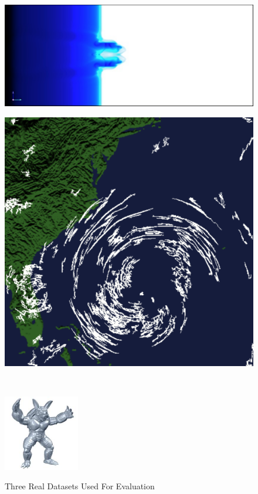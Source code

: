 \begin{figure}[h]
		\begin{center}
			\begin{subfloat}{%
				\includegraphics[scale=0.5]{figures/ionisation_front_instabilities.pdf}
			}
			\end{subfloat}

			\begin{subfloat}{%
				\includegraphics[scale=0.35]{figures/hurricane_isabel.pdf}
			}
			\end{subfloat}~
			\begin{subfloat} {%
				\includegraphics[scale=3]{figures/armadillo.pdf}
			}
			\end{subfloat}
		\end{center}

		\caption{Three Real Datasets Used For Evaluation}
		\label{fig:real-data}
\end{figure}

